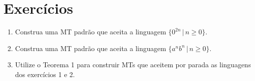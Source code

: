 \documentclass[a4paper]{article}
\theoremstyle{definition}
\begin{document}
  \section{Exercícios}

  \begin{enumerate}
     \item Construa uma MT padrão que aceita a linguagem $\{0^{2n}\,|\,n\geq
       0\}$.
     \item Construa uma MT padrão que aceita a linguagem $\{a^nb^n\,|\,n\geq
       0\}$.
     \item Utilize o Teorema 1 para construir MTs que aceitem por parada as
       linguagens dos exercícios 1 e 2.
  \end{enumerate}
\end{document}
